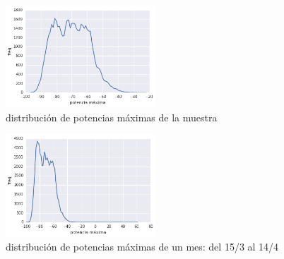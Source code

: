 \begin{figure}[H] 
  \centering
  \includegraphics[width=0.5\textwidth]{pot_max_muestra.png}
  \caption{distribución de potencias máximas de la muestra}
  \label{fig:pot_max_muestra}
\end{figure}

\begin{figure}[H] 
  \centering
  \includegraphics[width=0.5\textwidth]{pot_max_mes.png}
  \caption{distribución de potencias máximas de un mes: del 15/3 al 14/4}
  \label{fig:pot_max_mes}
\end{figure}




